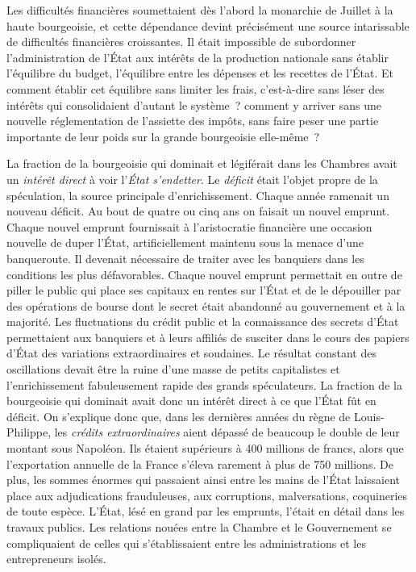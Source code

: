 \documentclass[french,twoside]{book} %
\begin{document}
Les difficultés financières soumettaient dès l’abord la monarchie de Juillet à la haute bourgeoisie, et cette dépendance devint précisément une source intarissable de difficultés financières croissantes. Il était impossible de subordonner l’administration de l’État aux intérêts de la production nationale sans établir l’équilibre du budget, l’équilibre entre les dépenses et les recettes de l’État. Et comment établir cet équilibre sans limiter les frais, c’est-à-dire sans léser des intérêts qui consolidaient d’autant le système ? comment y arriver sans une nouvelle réglementation de l’assiette des impôts, sans faire peser une partie importante de leur poids sur la grande bourgeoisie elle-même ?\par
La fraction de la bourgeoisie qui dominait et légiférait dans les Chambres avait un \emph{intérêt direct} à voir l’\emph{État s’endetter}. Le \emph{déficit} était l’objet propre de la spéculation, la source principale d’enrichissement. Chaque année ramenait un nouveau déficit. Au bout de quatre ou cinq ans on faisait un nouvel emprunt. Chaque nouvel emprunt fournissait à l’aristocratie financière une occasion nouvelle de duper l’État, artificiellement maintenu sous la menace d’une banqueroute. Il devenait nécessaire de traiter avec les banquiers dans les conditions les plus défavorables. Chaque nouvel emprunt permettait en outre de piller le public qui place ses capitaux en rentes sur l’État et de le dépouiller par des opérations de bourse dont le secret était abandonné au gouvernement et à la majorité. Les fluctuations du crédit public et la connaissance des secrets d’État permettaient aux banquiers et à leurs affiliés de susciter dans le cours des papiers d’État des variations extraordinaires et soudaines. Le résultat constant des oscillations devait être la ruine d’une masse de petits capitalistes et l’enrichissement fabuleusement rapide des grands spéculateurs. La fraction de la bourgeoisie qui dominait avait donc un intérêt direct à ce que l’État fût en déficit. On s’explique donc que, dans les dernières années du règne de Louis-Philippe, les \emph{crédits extraordinaires} aient dépassé de beaucoup le double de leur montant sous Napoléon. Ils étaient supérieurs à 400 millions de francs, alors que l’exportation annuelle de la France s’éleva rarement à plus de 750 millions. De plus, les sommes énormes qui passaient ainsi entre les mains de l’État laissaient place aux adjudications frauduleuses, aux corruptions, malversations, coquineries de toute espèce. L’État, lésé en grand par les emprunts, l’était en détail dans les travaux publics. Les relations nouées entre la Chambre et le Gouvernement se compliquaient de celles qui s’établissaient entre les administrations et les entrepreneurs isolés.\par
\end{document}
